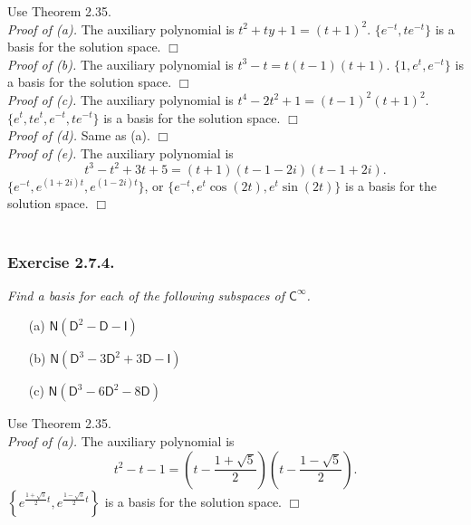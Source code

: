 \documentclass{article}
\begin{document}
Use Theorem 2.35. \\

\emph{Proof of (a).}
The auxiliary polynomial is $t^2+ty+1 = (t+1)^2$.
$\{ e^{-t}, te^{-t} \}$ is a basis for the solution space.
$\Box$ \\

\emph{Proof of (b).}
The auxiliary polynomial is $t^3-t = t(t-1)(t+1)$.
$\{ 1, e^{t}, e^{-t} \}$ is a basis for the solution space.
$\Box$ \\

\emph{Proof of (c).}
The auxiliary polynomial is $t^4-2t^2+1 = (t-1)^2(t+1)^2$.
$\{ e^{t}, te^{t}, e^{-t}, te^{-t} \}$ is a basis for the solution space.
$\Box$ \\

\emph{Proof of (d).}
Same as (a).
$\Box$ \\

\emph{Proof of (e).}
The auxiliary polynomial is $$t^3-t^2+3t+5 = (t+1)(t-1-2i)(t-1+2i).$$
$\{ e^{-t}, e^{(1+2i)t}, e^{(1-2i)t} \}$,
or $\{ e^{-t}, e^{t}\cos(2t), e^{t}\sin(2t) \}$
is a basis for the solution space.
$\Box$ \\\\






\subsubsection*{Exercise 2.7.4.}
\emph{Find a basis for each of the following subspaces of $\mathsf{C}^{\infty}$.}
\begin{enumerate}
\item[(a)]
$\mathsf{N}(\mathsf{D}^2-\mathsf{D}-\mathsf{I})$
\item[(b)]
$\mathsf{N}(\mathsf{D}^3-3\mathsf{D}^2+3\mathsf{D}-\mathsf{I})$
\item[(c)]
$\mathsf{N}(\mathsf{D}^3-6\mathsf{D}^2-8\mathsf{D})$ \\
\end{enumerate}

Use Theorem 2.35. \\

\emph{Proof of (a).}
The auxiliary polynomial is
$$t^2-t-1 = \left(t-\frac{1+\sqrt{5}}{2}\right)\left(t-\frac{1-\sqrt{5}}{2}\right).$$
$\left\{ e^{\frac{1+\sqrt{5}}{2}t}, e^{\frac{1-\sqrt{5}}{2}t} \right\}$
is a basis for the solution space.
$\Box$ \\
\end{document}
